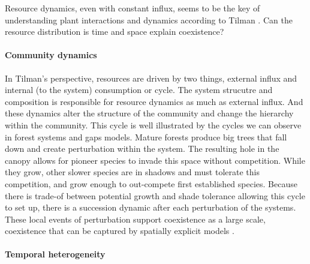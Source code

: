 
Resource dynamics, even with constant influx, seems to be the key of understanding plant interactions and dynamics according to Tilman \cite{tilman_plant_1988}. Can the resource distribution is time and space explain coexistence?

\paragraph{Community dynamics}

In Tilman's perspective, resources are driven by two things, external influx and internal (to the system) consumption or cycle. The system strucutre and composition is responsible for resource dynamics as much as external influx. And these dynamics alter the structure of the community and change the hierarchy within the community. This cycle is well illustrated by the cycles we can observe in forest systems and gaps models. Mature forests produce big trees that fall down and create perturbation within the system. The resulting hole in the canopy allows for pioneer species to invade this space without competition. While they grow, other slower species are in shadows and must tolerate this competition, and grow enough to out-compete first established species. Because there is trade-of between potential growth and shade tolerance allowing this cycle to set up, there is a succession dynamic after each perturbation of the systems. These local events of perturbation support coexistence as a large scale, coexistence that can be captured by spatially explicit models \cite{chave_study_1999, falster_plant:_2016}.

\paragraph{Temporal heterogeneity}


